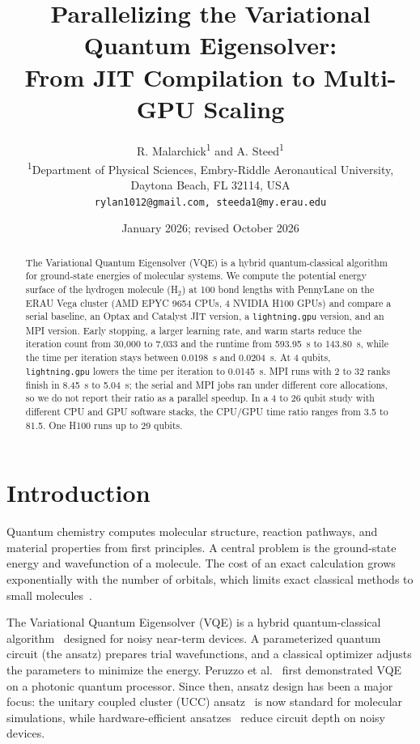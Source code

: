 \documentclass[11pt]{article}
\title{Parallelizing the Variational Quantum Eigensolver: \\
From JIT Compilation to Multi-GPU Scaling}
\author{
R. Malarchick\textsuperscript{1} and A. Steed\textsuperscript{1} \\[0.5em]
\textsuperscript{1}Department of Physical Sciences, Embry-Riddle Aeronautical University, \\
Daytona Beach, FL 32114, USA \\[0.5em]
\texttt{rylan1012@gmail.com, steeda1@my.erau.edu}
}
\date{January 2026; revised October 2026}
\begin{document}
\maketitle

\begin{abstract}
    The Variational Quantum Eigensolver (VQE) is a hybrid quantum-classical algorithm for ground-state energies of molecular systems. We compute the potential energy surface of the hydrogen molecule (H$_2$) at 100 bond lengths with PennyLane on the ERAU Vega cluster (AMD EPYC 9654 CPUs, 4 NVIDIA H100 GPUs) and compare a serial baseline, an Optax and Catalyst JIT version, a \texttt{lightning.gpu} version, and an MPI version. Early stopping, a larger learning rate, and warm starts reduce the iteration count from 30,000 to 7,033 and the runtime from 593.95~s to 143.80~s, while the time per iteration stays between 0.0198~s and 0.0204~s. At 4 qubits, \texttt{lightning.gpu} lowers the time per iteration to 0.0145~s. MPI runs with 2 to 32 ranks finish in 8.45~s to 5.04~s; the serial and MPI jobs ran under different core allocations, so we do not report their ratio as a parallel speedup. In a 4 to 26 qubit study with different CPU and GPU software stacks, the CPU/GPU time ratio ranges from 3.5 to 81.5. One H100 runs up to 29 qubits.
\end{abstract}

\section{Introduction}

Quantum chemistry computes molecular structure, reaction pathways, and material properties from first principles. A central problem is the ground-state energy and wavefunction of a molecule. The cost of an exact calculation grows exponentially with the number of orbitals, which limits exact classical methods to small molecules~\cite{mcardle2020}.

The Variational Quantum Eigensolver (VQE) is a hybrid quantum-classical algorithm~\cite{peruzzo2014,cerezo2021} designed for noisy near-term devices. A parameterized quantum circuit (the ansatz) prepares trial wavefunctions, and a classical optimizer adjusts the parameters to minimize the energy. Peruzzo et al.~\cite{peruzzo2014} first demonstrated VQE on a photonic quantum processor. Since then, ansatz design has been a major focus: the unitary coupled cluster (UCC) ansatz~\cite{romero2018} is now standard for molecular simulations, while hardware-efficient ansatzes~\cite{kandala2017} reduce circuit depth on noisy devices.
\end{document}
